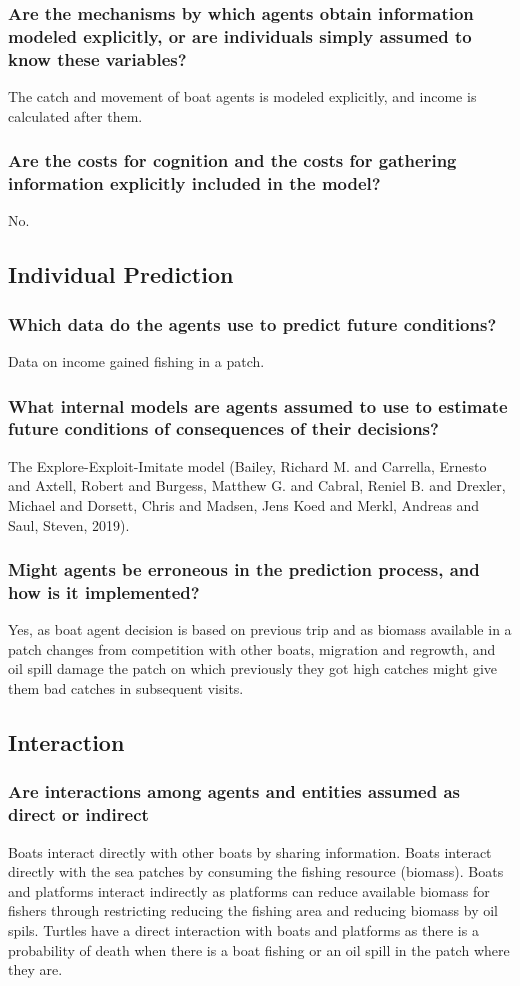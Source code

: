\documentclass[11pt]{article}
\begin{document}
\subsubsection{Are the mechanisms by which agents obtain information modeled explicitly, or are individuals simply assumed to know these variables?}
\label{sec:orgabf88f1}
The catch and movement of boat agents is modeled explicitly, and income is calculated after them.
\subsubsection{Are the costs for cognition and the costs for gathering information explicitly included in the model?}
\label{sec:orgcca156c}
No. 
\subsection{Individual Prediction}
\label{sec:orgd61c6fc}
\subsubsection{Which data do the agents use to predict future conditions?}
\label{sec:orgc4bff7b}
Data on income gained fishing in a patch.
\subsubsection{What internal models are agents assumed to use to estimate future conditions of consequences of their decisions?}
\label{sec:org8e0fd9c}
The Explore-Exploit-Imitate model (Bailey, Richard M. and Carrella, Ernesto and Axtell, Robert and Burgess, Matthew G. and Cabral, Reniel B. and Drexler, Michael and Dorsett, Chris and Madsen, Jens Koed and Merkl, Andreas and Saul, Steven, 2019).
\subsubsection{Might agents be erroneous in the prediction process, and how is it implemented?}
\label{sec:orgef43f58}
Yes, as boat agent decision is based on previous trip and as biomass available in a patch changes from competition with other boats, migration and regrowth, and oil spill damage the patch on which previously they got high catches might give them bad catches in subsequent visits. 
\subsection{Interaction}
\label{sec:orga42aaff}
\subsubsection{Are interactions among agents and entities assumed as direct or indirect}
\label{sec:org8c15c97}
Boats interact directly with other boats by sharing information. Boats interact directly with the sea patches by consuming the fishing resource (biomass). Boats and platforms interact indirectly as platforms can reduce available biomass for fishers through restricting reducing the fishing area and reducing biomass by oil spils. Turtles have a direct interaction with boats and platforms as there is a probability of death when there is a boat fishing or an oil spill in the patch where they are.
\end{document}
